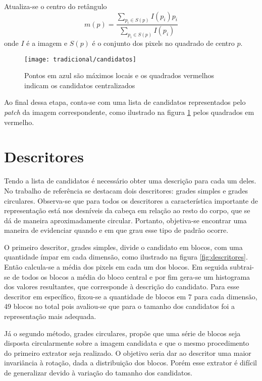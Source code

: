 Atualiza-se o centro do retângulo
\begin{equation}
	\label{eq:mean-shift}
	m(p) = \frac{\sum_{p_i \in S(p)} I(p_i)p_i}{\sum_{p_i \in S(p)} I(p_i)}
\end{equation}
onde $I$ é a imagem e $S(p)$ é o conjunto dos pixels no quadrado de centro $p$.

\begin{figure}[h]
\centering
\texttt{[image: tradicional/candidatos]}
\caption{Pontos em azul são máximos locais e os quadrados vermelhos indicam os candidatos centralizados}
\label{fig:candidatos}
\end{figure}

Ao final dessa etapa, conta-se com uma lista de candidatos representados pelo \textit{patch} da imagem correspondente, como ilustrado na figura \ref{fig:candidatos} pelos quadrados em vermelho.

\section{Descritores}
Tendo a lista de candidatos é necessário obter uma descrição para cada um deles. No trabalho de referência se destacam dois descritores: grades simples e grades circulares. Observa-se que para todos os descritores a característica importante de representação está nos desníveis da cabeça em relação ao resto do corpo, que se dá de maneira aproximadamente circular. Portanto, objetiva-se encontrar uma maneira de evidenciar quando e em que grau esse tipo de padrão ocorre.

O primeiro descritor, grades simples, divide o candidato em blocos, com uma quantidade ímpar em cada dimensão, como ilustrado na figura \ref{fig:descritores}. Então calcula-se a média dos pixels em cada um dos blocos. Em seguida subtrai-se de todos os blocos a média do bloco central e por fim gera-se um histograma dos valores resultantes, que corresponde à descrição do candidato. Para esse descritor em específico, fixou-se a quantidade de blocos em 7 para cada dimensão, 49 blocos no total pois avaliou-se que para o tamanho dos candidatos foi a representação mais adequada.

Já o segundo método, grades circulares, propõe que uma série de blocos seja disposta circularmente sobre a imagem candidata e que o mesmo procedimento do primeiro extrator seja realizado. O objetivo seria dar ao descritor uma maior invariância à rotação, dada a distribuição dos blocos. Porém esse extrator é difícil de generalizar devido à variação do tamanho dos candidatos.

